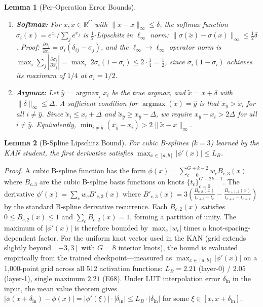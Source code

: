 \documentclass[journal,onecolumn]{IEEEtran}
\newtheorem{lemma}{Lemma}
\begin{document}
\begin{lemma}[Per-Operation Error Bounds]
\begin{enumerate}
    \item \textbf{Softmax:} For $x, \tilde{x} \in \mathbb{R}^C$ with $\|\tilde{x} - x\|_\infty \leq \delta$, the softmax function $\sigma_i(x) = e^{x_i} / \sum_j e^{x_j}$ is $\frac{1}{2}$-Lipschitz in $\ell_\infty$ norm: $\|\sigma(\tilde{x}) - \sigma(x)\|_\infty \leq \frac{1}{2}\delta$. \textit{Proof:} $\frac{\partial \sigma_i}{\partial x_j} = \sigma_i(\delta_{ij} - \sigma_j)$, and the $\ell_\infty \to \ell_\infty$ operator norm is $\max_i \sum_j |\frac{\partial \sigma_i}{\partial x_j}| = \max_i \; 2\sigma_i(1-\sigma_i) \leq 2 \cdot \frac{1}{4} = \frac{1}{2}$, since $\sigma_i(1-\sigma_i)$ achieves its maximum of $1/4$ at $\sigma_i = 1/2$.

    \item \textbf{Argmax:} Let $\hat{y} = \operatorname{argmax}_i x_i$ be the true argmax, and $\tilde{x} = x + \delta$ with $\|\delta\|_\infty \leq \Delta$. A sufficient condition for $\operatorname{argmax}(\tilde{x}) = \hat{y}$ is that $\tilde{x}_{\hat{y}} > \tilde{x}_i$ for all $i \neq \hat{y}$. Since $\tilde{x}_i \leq x_i + \Delta$ and $\tilde{x}_{\hat{y}} \geq x_{\hat{y}} - \Delta$, we require $x_{\hat{y}} - x_i > 2\Delta$ for all $i \neq \hat{y}$. Equivalently, $\min_{i \neq \hat{y}} (x_{\hat{y}} - x_i) > 2\|\tilde{x} - x\|_\infty$.
\end{enumerate}
\end{lemma}

\begin{lemma}[B-Spline Lipschitz Bound]
\label{lem:bspline_lipschitz}
For cubic B-splines ($k=3$) learned by the KAN student, the first
derivative satisfies $\max_{x \in [a,b]} |\phi'(x)| \leq L_B$.
\end{lemma}

\noindent\textit{Proof.} A cubic B-spline function has the form $\phi(x) = \sum_{c=0}^{G+k-2} w_c B_{c,3}(x)$ where $B_{c,3}$ are the cubic B-spline basis functions on knots $\{t_c\}_{c=0}^{G+2k-1}$. The derivative $\phi'(x) = \sum_c w_c B'_{c,3}(x)$ where $B'_{c,3}(x) = 3(\frac{B_{c,2}(x)}{t_{c+3}-t_c} - \frac{B_{c+1,2}(x)}{t_{c+4}-t_{c+1}})$ by the standard B-spline derivative recurrence. Each $B_{c,2}(x)$ satisfies $0 \leq B_{c,2}(x) \leq 1$ and $\sum_c B_{c,2}(x) = 1$, forming a partition of unity. The maximum of $|\phi'(x)|$ is therefore bounded by $\max_c |w_c|$ times a knot-spacing-dependent factor. For the uniform knot vector used in the KAN (grid extends slightly beyond $[-3,3]$ with $G=8$ interior knots), the bound is evaluated empirically from the trained checkpoint---measured as $\max_{x \in [a,b]} |\phi'(x)|$ on a 1,000-point grid across all 512 activation functions: $L_B = 2.21$ (layer-0) / $2.05$ (layer-1), single maximum $2.21$ (E68).
Under LUT interpolation error $\delta_{\text{in}}$ in the input, the mean value theorem gives $|\phi(x+\delta_{\text{in}}) - \phi(x)| = |\phi'(\xi)| \cdot |\delta_{\text{in}}| \leq L_B \cdot |\delta_{\text{in}}|$ for some $\xi \in [x, x+\delta_{\text{in}}]$.
\end{document}

